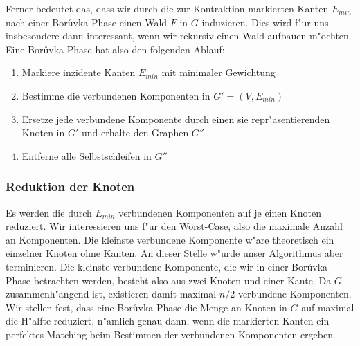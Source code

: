 Ferner bedeutet das, dass wir durch die zur Kontraktion markierten Kanten
    $E_{min}$ nach einer Bor\r uvka-Phase einen Wald $F$ in $G$ induzieren.
    Dies wird f"ur uns insbesondere dann interessant, wenn
    wir rekursiv einen Wald aufbauen m"ochten.\\
Eine Bor\r uvka-Phase hat also den folgenden Ablauf:
\begin{enumerate}
    \item Markiere inzidente Kanten $E_{min}$ mit minimaler Gewichtung
    \item Bestimme die verbundenen Komponenten in $G' = (V,E_{min})$
    \item Ersetze jede verbundene Komponente durch einen sie repr"asentierenden
          Knoten in $G'$ und erhalte den Graphen $G''$
    \item Entferne alle Selbstschleifen in $G''$
\end{enumerate}

\subsubsection{Reduktion der Knoten}
Es werden die durch $E_{min}$ verbundenen Komponenten auf je einen Knoten 
    reduziert.
    Wir interessieren uns f"ur den Worst-Case, also die maximale Anzahl an 
    Komponenten.
    Die kleinste verbundene Komponente w"are theoretisch ein
    einzelner Knoten ohne Kanten.
    An dieser Stelle w"urde unser Algorithmus aber terminieren.
    Die kleinste verbundene Komponente, die wir in einer Bor\r uvka-Phase 
    betrachten werden, besteht also aus zwei Knoten und einer Kante.
    Da $G$ zusammenh"angend ist, existieren damit maximal $n/2$ verbundene
    Komponenten.\\
Wir stellen fest, dass eine Bor\r uvka-Phase die Menge an Knoten in $G$ auf 
    maximal die H"alfte reduziert, n"amlich genau dann, wenn die markierten 
    Kanten ein perfektes Matching beim Bestimmen der verbundenen Komponenten
    ergeben.\\
